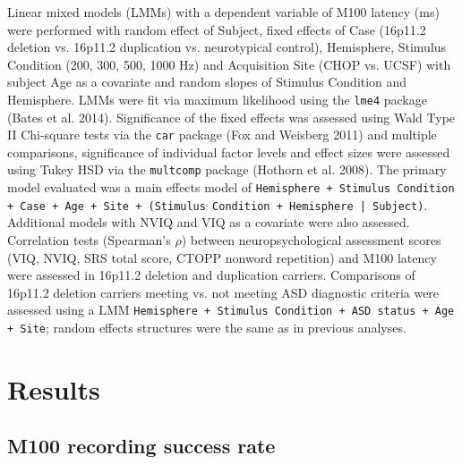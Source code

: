 \documentclass{article}
\begin{document}
Linear mixed models (LMMs) with a dependent variable of M100 latency (ms) were performed with random effect of Subject, fixed effects of Case (16p11.2 deletion vs. 16p11.2 duplication vs. neurotypical control), Hemisphere, Stimulus Condition (200, 300, 500, 1000 Hz) and Acquisition Site (CHOP vs. UCSF) with subject Age as a covariate and random slopes of Stimulus Condition and Hemisphere.  LMMs were fit via maximum likelihood using the \texttt{lme4} package (Bates et al. 2014). Significance of the fixed effects was assessed using Wald Type II Chi-square tests via the \texttt{car} package (Fox and Weisberg 2011) and multiple comparisons, significance of individual factor levels and effect sizes were assessed using Tukey HSD via the \texttt{multcomp} package (Hothorn et al. 2008). The primary model evaluated was a main effects model of \texttt{Hemisphere + Stimulus Condition + Case + Age + Site + (Stimulus Condition + Hemisphere | Subject)}. Additional models with NVIQ and VIQ as a covariate were also assessed. Correlation tests (Spearman’s $\rho$) between neuropsychological assessment scores (VIQ, NVIQ, SRS total score, CTOPP non\-word repetition) and M100 latency were assessed in 16p11.2 deletion and duplication carriers. Comparisons of 16p11.2 deletion carriers meeting vs. not meeting ASD diagnostic criteria were assessed using a LMM \texttt{Hemisphere + Stimulus Condition + ASD status + Age + Site}; random effects structures were the same as in previous analyses.

\section*{Results}

\subsection*{M100 recording success rate}
\end{document}
